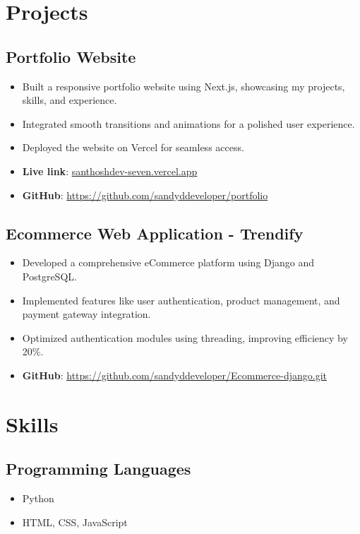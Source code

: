 \documentclass[11pt]{article}
\begin{document}
\section{Projects}
\subsection{Portfolio Website} 
\begin{itemize}
    \item Built a responsive portfolio website using Next.js, showcasing my projects, skills, and experience.
    \item Integrated smooth transitions and animations for a polished user experience.
    \item Deployed the website on Vercel for seamless access.
    \item \textbf{Live link}: \href{https://santhoshdev-seven.vercel.app/}{santhoshdev-seven.vercel.app}
    \item \textbf{GitHub}: \href{https://github.com/sandyddeveloper/portfolio}{https://github.com/sandyddeveloper/portfolio}
\end{itemize}

\subsection{Ecommerce Web Application - Trendify}
\begin{itemize}
    \item Developed a comprehensive eCommerce platform using Django and PostgreSQL.
    \item Implemented features like user authentication, product management, and payment gateway integration.
    \item Optimized authentication modules using threading, improving efficiency by 20\%.
    \item \textbf{GitHub}: \href{https://github.com/sandyddeveloper/Ecommerce-django.git}{https://github.com/sandyddeveloper/Ecommerce-django.git}
\end{itemize}

\section{Skills}
\subsection{Programming Languages}
\begin{itemize}
    \item Python
    \item HTML, CSS, JavaScript
\end{itemize}
\end{document}
